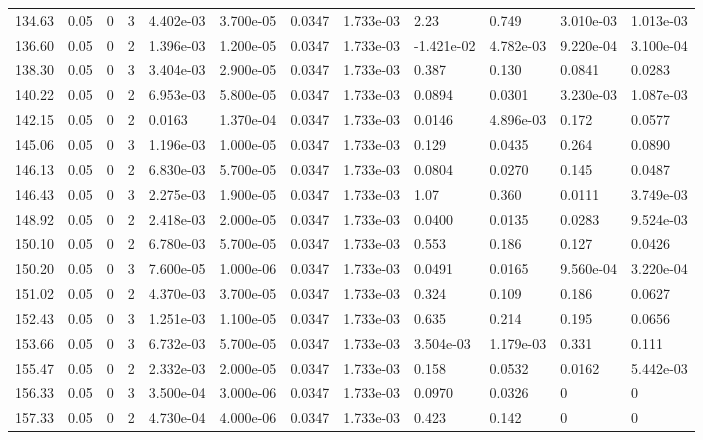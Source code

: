 \documentclass[preview]{standalone}
\begin{document}
{{{{\begin{tabular}{L{1.2cm}C{1.2cm} C{0.3cm}C{0.5cm} C{1.4cm}C{1.4cm} C{1.4cm}C{1.4cm} C{1.6cm}C{1.6cm} C{1.6cm}C{1.6cm}}
  134.63  &  0.05  & 0     &  3 &  4.402e-03  & 3.700e-05  &  0.0347&   1.733e-03& 2.23 & 0.749   &  3.010e-03 & 1.013e-03  \\ 
  136.60  &  0.05  & 0     &  2 &  1.396e-03  & 1.200e-05  &  0.0347&   1.733e-03& -1.421e-02 & 4.782e-03   &  9.220e-04 & 3.100e-04  \\ 
  138.30  &  0.05  & 0     &  3 &  3.404e-03  & 2.900e-05  &  0.0347&   1.733e-03& 0.387 & 0.130   &  0.0841 & 0.0283  \\ 
  140.22  &  0.05  & 0     &  2 &  6.953e-03  & 5.800e-05  &  0.0347&   1.733e-03& 0.0894 & 0.0301   &  3.230e-03 & 1.087e-03  \\ 
  142.15  &  0.05  & 0     &  2 &  0.0163  & 1.370e-04  &  0.0347&   1.733e-03& 0.0146 & 4.896e-03   &  0.172 & 0.0577  \\ 
  145.06  &  0.05  & 0     &  3 &  1.196e-03  & 1.000e-05  &  0.0347&   1.733e-03& 0.129 & 0.0435   &  0.264 & 0.0890  \\ 
  146.13  &  0.05  & 0     &  2 &  6.830e-03  & 5.700e-05  &  0.0347&   1.733e-03& 0.0804 & 0.0270   &  0.145 & 0.0487  \\ 
  146.43  &  0.05  & 0     &  3 &  2.275e-03  & 1.900e-05  &  0.0347&   1.733e-03& 1.07 & 0.360   &  0.0111 & 3.749e-03  \\ 
  148.92  &  0.05  & 0     &  2 &  2.418e-03  & 2.000e-05  &  0.0347&   1.733e-03& 0.0400 & 0.0135   &  0.0283 & 9.524e-03  \\ 
  150.10  &  0.05  & 0     &  2 &  6.780e-03  & 5.700e-05  &  0.0347&   1.733e-03& 0.553 & 0.186   &  0.127 & 0.0426  \\ 
  150.20  &  0.05  & 0     &  3 &  7.600e-05  & 1.000e-06  &  0.0347&   1.733e-03& 0.0491 & 0.0165   &  9.560e-04 & 3.220e-04  \\ 
  151.02  &  0.05  & 0     &  2 &  4.370e-03  & 3.700e-05  &  0.0347&   1.733e-03& 0.324 & 0.109   &  0.186 & 0.0627  \\ 
  152.43  &  0.05  & 0     &  3 &  1.251e-03  & 1.100e-05  &  0.0347&   1.733e-03& 0.635 & 0.214   &  0.195 & 0.0656  \\ 
  153.66  &  0.05  & 0     &  3 &  6.732e-03  & 5.700e-05  &  0.0347&   1.733e-03& 3.504e-03 & 1.179e-03   &  0.331 & 0.111  \\ 
  155.47  &  0.05  & 0     &  2 &  2.332e-03  & 2.000e-05  &  0.0347&   1.733e-03& 0.158 & 0.0532   &  0.0162 & 5.442e-03  \\ 
  156.33  &  0.05  & 0     &  3 &  3.500e-04  & 3.000e-06  &  0.0347&   1.733e-03& 0.0970 & 0.0326   &  0 & 0  \\ 
  157.33  &  0.05  & 0     &  2 &  4.730e-04  & 4.000e-06  &  0.0347&   1.733e-03& 0.423 & 0.142   &  0 & 0  \\ 
\hline 
\end{tabular} 

}}}}
\end{document}
